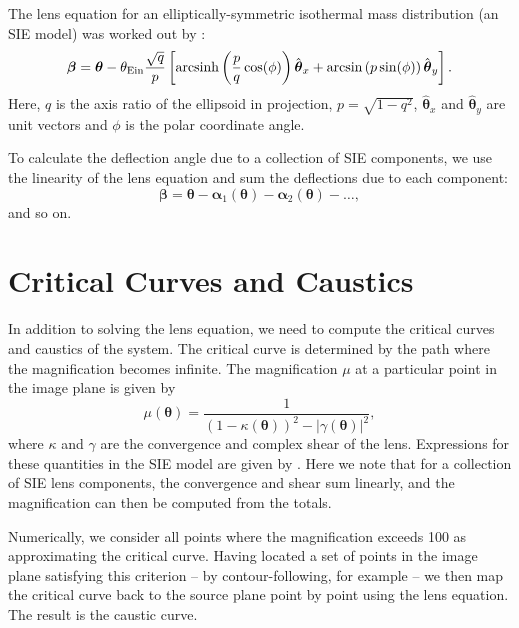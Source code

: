 \documentclass[iop]{emulateapj}
\def\thein{\theta_{\rm Ein}}
\begin{document}
The lens equation for an elliptically-symmetric isothermal mass
distribution (an SIE model) was worked out by \citet{KSB94}: 
\begin{equation}
  \boldsymbol{\beta} = \boldsymbol{\theta} - 
     \thein \frac{\sqrt{q}}{p} 
       \left[ \mbox{arcsinh} \left( \frac{p}{q} \cos(\phi) \right) 
                 \hat{\boldsymbol{\theta}}_x + 
              \mbox{arcsin}  \left( p \sin(\phi) \right) 
                 \hat{\boldsymbol{\theta}}_y   \right].
\end{equation}
Here, $q$ is the axis ratio of the ellipsoid in projection, $p =
\sqrt{1-q^2}$, $\hat{\boldsymbol{\theta}}_x$ and $\hat{\boldsymbol{\theta}}_y$ are unit
vectors and $\phi$ is the polar coordinate angle.

To calculate the deflection angle due to a collection of SIE components, we
use the linearity of the lens equation and sum the deflections due to each
component: 
\begin{equation}
  \boldsymbol{\beta} = \boldsymbol{\theta} 
                       - \boldsymbol{\alpha}_1(\boldsymbol{\theta})
                       - \boldsymbol{\alpha}_2(\boldsymbol{\theta})
                       - \ldots ,
\end{equation}
and so on.



\section{Critical Curves and Caustics}

In addition to solving the lens equation, we need to compute the critical curves
and caustics of the system. The critical curve is determined by the path where
the magnification becomes infinite. The magnification $\mu$ at a particular
point in the image plane is given by  
\begin{equation}
  \mu(\boldsymbol{\theta}) = \frac{1}
{\left(1-\kappa(\boldsymbol{\theta})\right)^2 - |\gamma(\boldsymbol{\theta})|^2},
  \label{mu}
\end{equation}
where $\kappa$ and $\gamma$ are the convergence and complex shear of the lens.
Expressions for these quantities in the SIE model are given by \citet{KSB94}.
Here we note that for a collection of SIE lens components, the convergence and
shear sum linearly, and the magnification can then be computed from the
totals. 

Numerically, we consider all points where the magnification exceeds 100 as
approximating the critical curve. Having located a set of points in the image
plane satisfying this criterion -- by contour-following, for example -- we then
map the critical curve back to the source plane point by point using the lens
equation. The result is the caustic curve.
\end{document}
